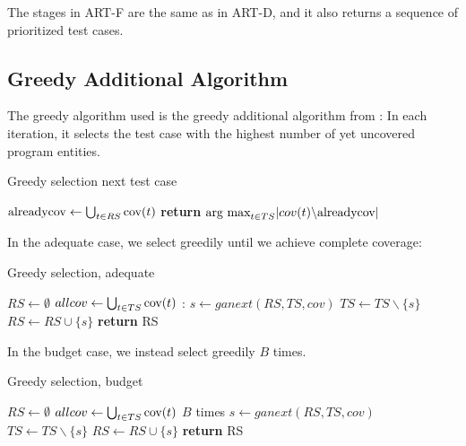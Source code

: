 The stages in ART-F are the same as in ART-D, and it also returns a
sequence of prioritized test cases.

\subsection{Greedy Additional Algorithm}

The greedy algorithm used is the greedy additional algorithm from
\cite{rothermel2001prioritizing}: In each iteration, it selects the test
case with the highest number of yet uncovered program entities.

\begin{algorithm}
\caption[Greedy selection next test case]{Greedy selection next test case}\label{code:ganext}
\begin{algorithmic}
	\State $\hbox{alreadycov} \gets \bigcup_{t \in RS} \hbox{cov}(t)$
	\State \textbf{return} $\hbox{arg max}_{t \in TS} |cov(t)\backslash \hbox{alreadycov}|$
\EndFunction
\end{algorithmic}
\end{algorithm}

In the adequate case, we select greedily until we achieve complete
coverage:

\begin{algorithm}
\caption[Greedy selection, adequate]{Greedy selection, adequate}\label{code:gaadequate}
\begin{algorithmic}
	\State $RS \gets \emptyset$
	\State $allcov \gets \bigcup_{t \in TS} \hbox{cov}(t)$
	:
		\State $s \gets ganext(RS, TS, cov)$
		\State $TS \gets TS \backslash \{s\}$
		\State $RS \gets RS \cup \{s\}$
	\EndWhile
	\State \textbf{return} RS
\EndFunction
\end{algorithmic}
\end{algorithm}

In the budget case, we instead select greedily $B$ times.

\begin{algorithm}
\caption[Greedy selection, budget]{Greedy selection, budget}\label{code:gabudget}
\begin{algorithmic}
	\State $RS \gets \emptyset$
	\State $allcov \gets \bigcup_{t \in TS} \hbox{cov}(t)$
	\For $B$ times
		\State $s \gets ganext(RS, TS, cov)$
		\State $TS \gets TS \backslash \{s\}$
		\State $RS \gets RS \cup \{s\}$
	\EndFor
	\State \textbf{return} RS
\EndFunction
\end{algorithmic}
\end{algorithm}
